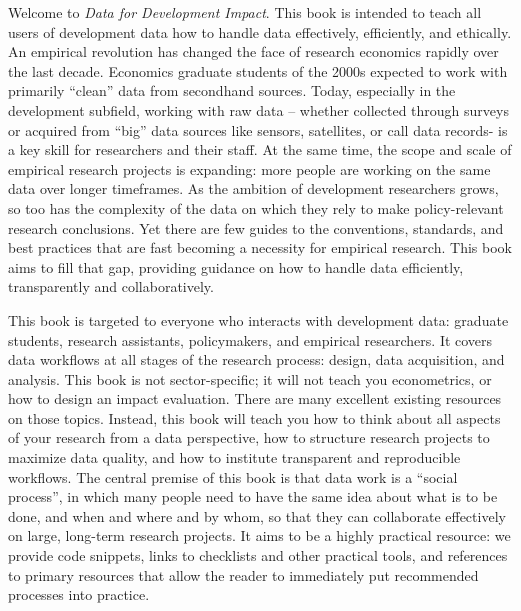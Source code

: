 \begin{fullwidth}
Welcome to \textit{Data for Development Impact}.
This book is intended to teach all users of development data 
how to handle data effectively, efficiently, and ethically. 
An empirical revolution has changed the face of research economics rapidly over the last decade. 
Economics graduate students of the 2000s expected to work with primarily ``clean'' data from secondhand sources. 
Today, especially in the development subfield, working with raw data -- 
whether collected through surveys or acquired from ``big'' data sources like sensors, satellites, or call data records- 
is a key skill for researchers and their staff. 
At the same time, the scope and scale of empirical research projects is expanding: 
more people are working on the same data over longer timeframes. 
As the ambition of development researchers grows, so too has the complexity of the data
on which they rely to make policy-relevant research conclusions. 
Yet there are few guides to the conventions, standards, and best practices 
that are fast becoming a necessity for empirical research.
This book aims to fill that gap, providing guidance on how to handle data efficiently, transparently and collaboratively. 

This book is targeted to everyone who interacts with development data: 
graduate students, research assistants, policymakers, and empirical researchers. 
It covers data workflows at all stages of the research process: design, data acquisition, and analysis.
This book is not sector-specific; it will not teach you econometrics, or how to design an impact evaluation. 
There are many excellent existing resources on those topics. 
Instead, this book will teach you how to think about all aspects of your research from a data perspective, 
how to structure research projects to maximize data quality, 
and how to institute transparent and reproducible workflows. 
The central premise of this book is that data work is a ``social process'',
in which many people need to have the same idea about what is to be done, and when and where and by whom,
so that they can collaborate effectively on large, long-term research projects.
It aims to be a highly practical resource: we provide code snippets, links to checklists and other practical tools, 
and references to primary resources that allow the reader to immediately put recommended processes into practice. 


\end{fullwidth}


